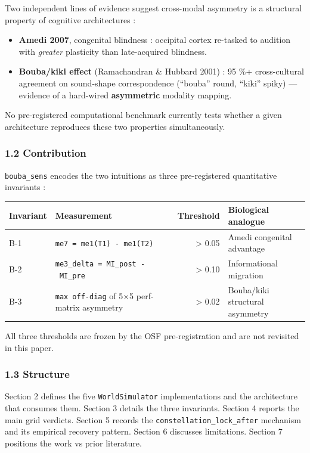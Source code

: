 \documentclass[
]{article}
\newcounter{none} %
\providecommand{\tightlist}{%
  \setlength{\itemsep}{0pt}\setlength{\parskip}{0pt}}
\begin{document}
Two independent lines of evidence suggest cross-modal asymmetry is a
structural property of cognitive architectures :

\begin{itemize}
\tightlist
\item
  \textbf{Amedi 2007}, congenital blindness : occipital cortex re-tasked
  to audition with \emph{greater} plasticity than late-acquired
  blindness.
\item
  \textbf{Bouba/kiki effect} (Ramachandran \& Hubbard 2001) : 95 \%+
  cross-cultural agreement on sound-shape correspondence (``bouba''
  round, ``kiki'' spiky) --- evidence of a hard-wired
  \textbf{asymmetric} modality mapping.
\end{itemize}

No pre-registered computational benchmark currently tests whether a
given architecture reproduces these two properties simultaneously.

\subsubsection{1.2 Contribution}\label{12-contribution}

\texttt{bouba\_sens} encodes the two intuitions as three pre-registered
quantitative invariants :

{\def\LTcaptype{none} %
\begin{longtable}[]{@{}llrl@{}}
\toprule\noalign{}
Invariant & Measurement & Threshold & Biological analogue \\
\midrule\noalign{}
\endhead
\bottomrule\noalign{}
\endlastfoot
B-1 & \texttt{me7\ =\ me1(T1)\ -\ me1(T2)} & \textgreater{} 0.05 & Amedi
congenital advantage \\
B-2 & \texttt{me3\_delta\ =\ MI\_post\ -\ MI\_pre} & \textgreater{} 0.10
& Informational migration \\
B-3 & \texttt{max\ off-diag} of 5×5 perf-matrix asymmetry &
\textgreater{} 0.02 & Bouba/kiki structural asymmetry \\
\end{longtable}
}

All three thresholds are frozen by the OSF pre-registration and are not
revisited in this paper.

\subsubsection{1.3 Structure}\label{13-structure}

Section 2 defines the five \texttt{WorldSimulator} implementations and
the architecture that consumes them. Section 3 details the three
invariants. Section 4 reports the main grid verdicts. Section 5 records
the \texttt{constellation\_lock\_after} mechanism and its empirical
recovery pattern. Section 6 discusses limitations. Section 7 positions
the work vs prior literature.
\end{document}
